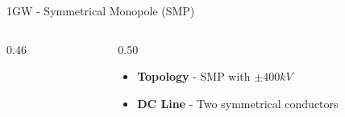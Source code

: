 


\begin{frame}{1GW - Symmetrical Monopole (SMP)}
  \begin{columns}[c,onlytextwidth]
    \begin{column}{0.46\textwidth}
      \centering
    \end{column}
    \begin{column}{0.50\textwidth}
      \vspace{0.5em}
      \begin{itemize}
        \setlength{\itemsep}{0.7em}
        \item \textbf{Topology} - SMP with $\pm400kV$
        \item \textbf{DC Line} - Two symmetrical conductors
      \end{itemize}
    \end{column}
  \end{columns}
\end{frame}



